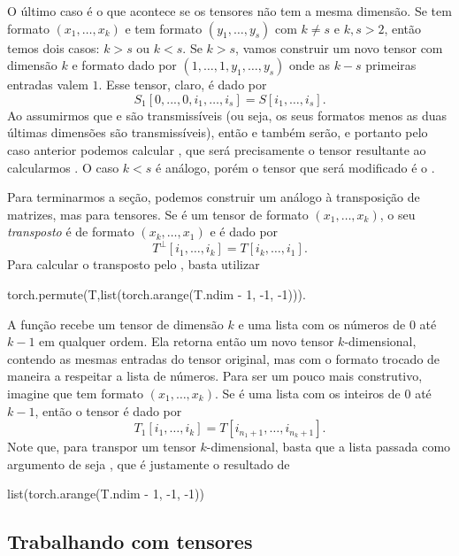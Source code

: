 \documentclass{article}
\begin{document}
O último caso é o que acontece se os tensores não tem a mesma dimensão. Se  tem formato $(x_1, \dots, x_k)$ e  tem formato $(y_1, \dots, y_s)$ com $k \neq s$ e $k, s > 2$, então temos dois casos: $k > s$ ou $k < s$. Se $k > s$, vamos construir um novo tensor  com dimensão $k$ e formato dado por $(1, \dots, 1, y_1, \dots, y_s)$ onde as $k-s$ primeiras entradas valem $1$. Esse tensor, claro, é dado por \begin{equation}
    S_1[0, ..., 0, i_1, \dots, i_s] = S[i_1, \dots, i_s].
\end{equation} Ao assumirmos que  e  são transmissíveis (ou seja, os seus formatos menos as duas últimas dimensões são transmissíveis), então  e  também serão, e portanto pelo caso anterior podemos calcular , que será precisamente o tensor resultante ao calcularmos . O caso $k < s$ é análogo, porém o tensor que será modificado é o .

Para terminarmos a seção, podemos construir um análogo à transposição de matrizes, mas para tensores. Se  é um tensor de formato $(x_1, \dots, x_k)$, o seu \textit{transposto} é de formato $(x_k, \dots, x_1)$ e é dado por \begin{equation}
    T^\perp[i_1, \dots, i_k] = T[i_k, \dots, i_1].
\end{equation} Para calcular o transposto pelo , basta utilizar \begin{python}
torch.permute(T,list(torch.arange(T.ndim - 1, -1, -1))).
\end{python} A função  recebe um tensor de dimensão $k$ e uma lista com os números de $0$ até $k-1$ em qualquer ordem. Ela retorna então um novo tensor $k$-dimensional, contendo as mesmas entradas do tensor original, mas com o formato trocado de maneira a respeitar a lista de números. Para ser um pouco mais construtivo, imagine que  tem formato $(x_1, \dots, x_k)$. Se  é uma lista com os inteiros de $0$ até $k-1$, então o tensor  é dado por \begin{equation}
    T_1[i_1, \dots, i_k] = T[i_{n_1 + 1}, \dots, i_{n_k + 1}].
\end{equation} Note que, para transpor um tensor $k$-dimensional, basta que a lista passada como argumento de  seja \pyth{[k-1, ..., 0]}, que é justamente o resultado de \begin{python}
list(torch.arange(T.ndim - 1, -1, -1))
\end{python}

\subsection{Trabalhando com tensores}



\nocite{*}
\printbibliography
\end{document}
